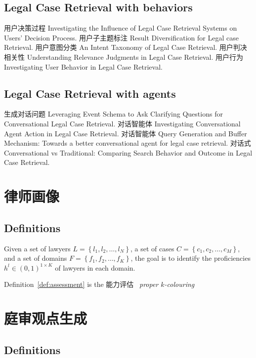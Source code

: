 \documentclass[lang=en,12pt]{beautybook}
\begin{document}
\section{Legal Case Retrieval with behaviors}
用户决策过程 Investigating the Influence of Legal Case Retrieval Systems on Users' Decision Process.
用户子主题标注 Result Diversification for Legal case Retrieval. 
用户意图分类 An Intent Taxonomy of Legal Case Retrieval. 
用户判决相关性 Understanding Relevance Judgments in Legal Case Retrieval. 
用户行为 Investigating User Behavior in Legal Case Retrieval. 

\section{Legal Case Retrieval with agents}
生成对话问题 Leveraging Event Schema to Ask Clarifying Questions for Conversational Legal Case Retrieval. 
对话智能体 Investigating Conversational Agent Action in Legal Case Retrieval. 
对话智能体 Query Generation and Buffer Mechanism: Towards a better conversational agent for legal case retrieval. 
对话式 Conversational vs Traditional: Comparing Search Behavior and Outcome in Legal Case Retrieval. 


\chapter{律师画像}

\section{Definitions}

\begin{defi}
\label{def:assessment}
Given a set of lawyers $L = \left\{l_{1}, l_{2}, \ldots, l_{N}\right\}$, a set of cases $C = \left\{c_{1}, c_{2}, \ldots, c_{M}\right\}$, and a set of domains $F = \left\{f_{1}, f_{2}, \ldots, f_{K}\right\}$, the goal is to identify the proficiencies $h^l \in(0,1)^{1 \times K}$ of lawyers in each domain.
\end{defi}
Definition~\ref{def:assessment} is the
能力评估~\citet{an2021lawyerpan}
\emph{proper $k$-colouring}

\chapter{庭审观点生成}

\section{Definitions}
\end{document}
